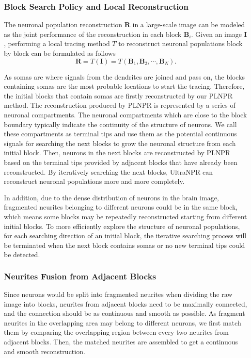 \subsubsection{Block Search Policy and Local Reconstruction}
\label{sec:trace}

The neuronal population reconstruction $\mathbf{R}$ in a large-scale image can be modeled as the joint performance of the reconstruction in each block $\mathbf{B}_i$.
Given an image $\mathbf{I}$, performing a local tracing method $T$ to reconstruct neuronal populations block by block can be formulated as follows
\begin{equation}
\mathbf{R} = T(\mathbf{I}) = T(\mathbf{B}_1, \mathbf{B}_2,\cdots,\mathbf{B}_N).
\end{equation}

As somas are where signals from the dendrites are joined and pass on, the blocks containing somas are the most probable locations to start the tracing.
Therefore, the initial blocks that contain somas are firstly reconstructed by our PLNPR method.
The reconstruction produced by PLNPR is represented by a series of neuronal compartments. The neuronal compartments which are close to the block boundary typically indicate the continuity of the structure of neurons. We call these compartments as terminal tips and use them as the potential continuous signals for searching the next blocks to grow the neuronal structure from each initial block.
%
Then, neurons in the next blocks are reconstructed by PLNPR based on the terminal tips provided by adjacent blocks that have already been reconstructed.
By iteratively searching the next blocks, UltraNPR can reconstruct neuronal populations more and more completely.

%
In addition, due to the dense distribution of neurons in the brain image, fragmented neurites belonging to different neurons could be in the same block, which means some blocks may be repeatedly reconstructed starting from different initial blocks.
To more efficiently explore the structure of neuronal populations, for each searching direction of an initial block, the iterative searching process will be terminated when the next block contains somas or no new terminal tips could be detected.


\subsubsection{Neurites Fusion from Adjacent Blocks}
Since neurons would be split into fragmented neurites when dividing the raw image into blocks, neurites from adjacent blocks need to be maximally connected, and the connection should be as continuous and smooth as possible.
As fragment neurites in the overlapping area may belong to different neurons, we first match them by comparing the overlapping region between every two neurites from adjacent blocks.
Then, the matched neurites are assembled to get a continuous and smooth reconstruction. 

